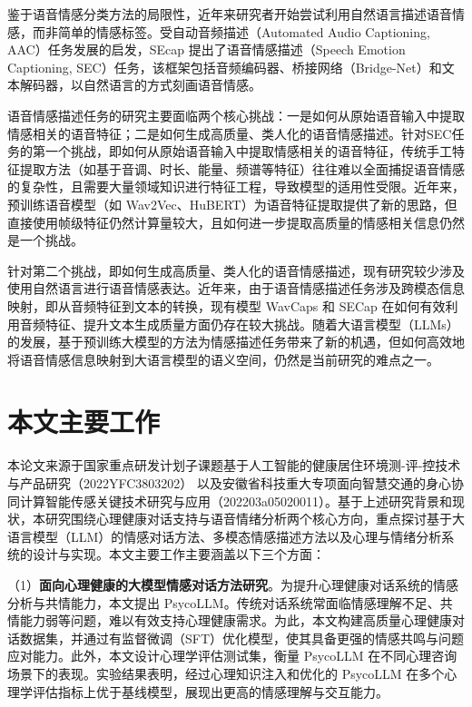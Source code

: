 鉴于语音情感分类方法的局限性，近年来研究者开始尝试利用自然语言描述语音情感，而非简单的情感标签。受自动音频描述（Automated Audio Captioning, AAC）\cite{Ye_Wang_Yang_Zou_2021}任务发展的启发，SEcap\cite{xu2024secap} 提出了语音情感描述（Speech Emotion Captioning, SEC）任务，该框架包括音频编码器、桥接网络（Bridge-Net）和文本解码器，以自然语言的方式刻画语音情感。

语音情感描述任务的研究主要面临两个核心挑战：一是如何从原始语音输入中提取情感相关的语音特征；二是如何生成高质量、类人化的语音情感描述。针对SEC任务的第一个挑战，即如何从原始语音输入中提取情感相关的语音特征，传统手工特征提取方法（如基于音调、时长、能量、频谱等特征）往往难以全面捕捉语音情感的复杂性，且需要大量领域知识进行特征工程，导致模型的适用性受限。近年来，预训练语音模型（如 Wav2Vec\cite{Schneider_Baevski_Collobert_Auli_2019}、HuBERT\cite{Hsu_Bolte_Tsai_Lakhotia_Salakhutdinov_Mohamed_2021}）为语音特征提取提供了新的思路，但直接使用帧级特征仍然计算量较大，且如何进一步提取高质量的情感相关信息仍然是一个挑战。

针对第二个挑战，即如何生成高质量、类人化的语音情感描述，现有研究较少涉及使用自然语言进行语音情感表达。近年来，由于语音情感描述任务涉及跨模态信息映射，即从音频特征到文本的转换，现有模型 WavCaps\cite{Mei_Meng_Liu_Kong_Ko_Zhao_Plumbley_Zou_Wang} 和 SECap\cite{xu2024secap} 在如何有效利用音频特征、提升文本生成质量方面仍存在较大挑战。随着大语言模型（LLMs）的发展，基于预训练大模型的方法为情感描述任务带来了新的机遇，但如何高效地将语音情感信息映射到大语言模型的语义空间，仍然是当前研究的难点之一。

\section{本文主要工作}

本论文来源于国家重点研发计划子课题基于人工智能的健康居住环境测-评-控技术与产品研究（2022YFC3803202）  以及安徽省科技重大专项面向智慧交通的身心协同计算智能传感关键技术研究与应用（202203a05020011）。基于上述研究背景和现状，本研究围绕心理健康对话支持与语音情绪分析两个核心方向，重点探讨基于大语言模型（LLM）的情感对话方法、多模态情感描述方法以及心理与情绪分析系统的设计与实现。本文主要工作主要涵盖以下三个方面：

（1）\textbf{面向心理健康的大模型情感对话方法研究}。为提升心理健康对话系统的情感分析与共情能力，本文提出 PsycoLLM。传统对话系统常面临情感理解不足、共情能力弱等问题，难以有效支持心理健康需求。为此，本文构建高质量心理健康对话数据集，并通过有监督微调（SFT）优化模型，使其具备更强的情感共鸣与问题应对能力。此外，本文设计心理学评估测试集，衡量 PsycoLLM 在不同心理咨询场景下的表现。实验结果表明，经过心理知识注入和优化的 PsycoLLM 在多个心理学评估指标上优于基线模型，展现出更高的情感理解与交互能力。

